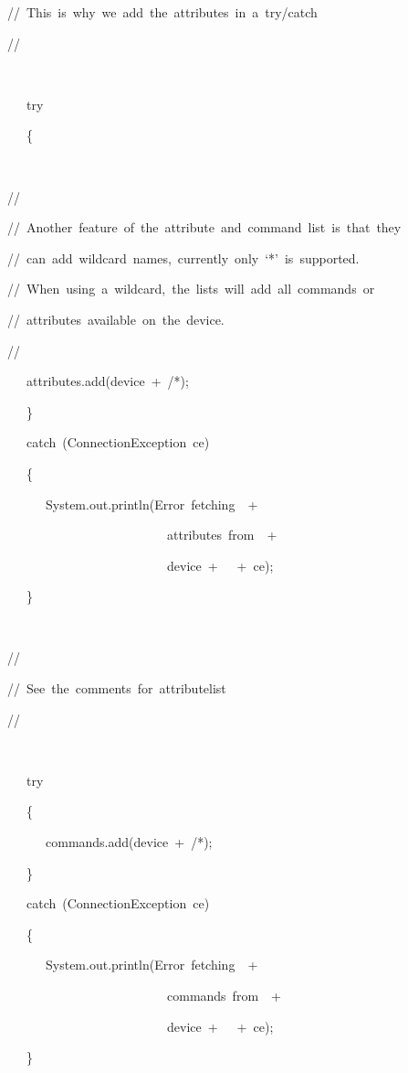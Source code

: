 \begin{lyxcode}
//~This~is~why~we~add~the~attributes~in~a~try/catch

//

~

~~~try

~~~\{

~

//

//~Another~feature~of~the~attribute~and~command~list~is~that~they

//~can~add~wildcard~names,~currently~only~`{*}'~is~supported.

//~When~using~a~wildcard,~the~lists~will~add~all~commands~or

//~attributes~available~on~the~device.

//

~~~attributes.add(device~+~\textquotedbl{}/{*}\textquotedbl{});

~~~\}

~~~catch~(ConnectionException~ce)

~~~\{

~~~~~~System.out.println(\textquotedbl{}Error~fetching~\textquotedbl{}~+~

~~~~~~~~~~~~~~~~~~~~~~~~~\textquotedbl{}attributes~from~\textquotedbl{}~+

~~~~~~~~~~~~~~~~~~~~~~~~~device~+~\textquotedbl{}~\textquotedbl{}~+~ce);

~~~\}

~



//

//~See~the~comments~for~attributelist

//

~



~~~try

~~~\{

~~~~~~commands.add(device~+~\textquotedbl{}/{*}\textquotedbl{});

~~~\}

~~~catch~(ConnectionException~ce)

~~~\{

~~~~~~System.out.println(\textquotedbl{}Error~fetching~\textquotedbl{}~+

~~~~~~~~~~~~~~~~~~~~~~~~~\textquotedbl{}commands~from~\textquotedbl{}~+

~~~~~~~~~~~~~~~~~~~~~~~~~device~+~\textquotedbl{}~\textquotedbl{}~+~ce);

~~~\}

~




\end{lyxcode}

